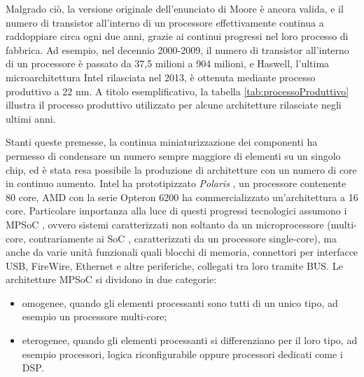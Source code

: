 Malgrado ci\`o, la versione originale dell'enunciato di Moore \`e ancora valida, e il numero di transistor
all'interno di un processore effettivamente continua a raddoppiare circa ogni due anni, grazie ai continui progressi
nel loro processo di fabbrica. Ad esempio, nel decennio 2000-2009, il numero di transistor all'interno di
un processore \`e passato da 37,5 milioni a 904 milioni, e Haswell, l'ultima microarchitettura Intel
rilasciata nel 2013, \`e ottenuta mediante processo produttivo a 22 nm.
A titolo esemplificativo, la tabella \ref{tab:processoProduttivo} illustra il processo produttivo utilizzato per
alcune architetture rilasciate negli ultimi anni.


Stanti queste premesse, la continua miniaturizzazione dei componenti ha permesso di condensare
un numero sempre maggiore di elementi su un singolo chip, ed \`e stata resa possibile la produzione di
architetture con un numero di core in continuo aumento. Intel ha prototipizzato \emph{Polaris} \cite{IntelPolaris},
un processore contenente 80 core, AMD con la serie Opteron\texttrademark{} 6200 ha commercializzato
un'architettura a 16 core.
Particolare importanza alla luce di questi progressi tecnologici assumono i \ac{MPSoC} \cite{MPSoCBook}, ovvero sistemi
caratterizzati non soltanto da un microprocessore (multi-core, contrariamente ai \ac{SoC} \cite{SoCBook}, caratterizzati
da un processore single-core), ma anche da varie unit\`a funzionali quali
blocchi di memoria, connettori per interfacce USB, FireWire, Ethernet e altre periferiche, collegati
tra loro tramite BUS. Le architetture \ac{MPSoC} si dividono in due categorie:
\begin{itemize}
  \item omogenee, quando gli elementi processanti sono tutti di un unico tipo, ad esempio un processore
    multi-core;
  \item eterogenee, quando gli elementi processanti si differenziano per il loro tipo, ad esempio processori,
    logica riconfigurabile oppure processori dedicati come i \acs{DSP}.
\end{itemize}
 

